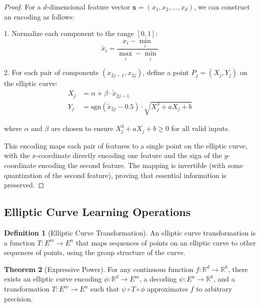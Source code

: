 \documentclass[12pt,a4paper]{article}
\theoremstyle{definition}
\newtheorem{theorem}{Theorem}
\newtheorem{definition}[theorem]{Definition}
\begin{document}
\begin{proof}
For a $d$-dimensional feature vector $\mathbf{x} = (x_1, x_2, \ldots, x_d)$, we can construct an encoding as follows:

1. Normalize each component to the range $[0, 1]$:
\begin{equation}
\tilde{x}_i = \frac{x_i - \min_i}{\max_i - \min_i}
\end{equation}

2. For each pair of components $(x_{2j-1}, x_{2j})$, define a point $P_j = (X_j, Y_j)$ on the elliptic curve:
\begin{align}
X_j &= \alpha + \beta \cdot \tilde{x}_{2j-1} \\
Y_j &= \text{sgn}(\tilde{x}_{2j} - 0.5) \cdot \sqrt{X_j^3 + aX_j + b}
\end{align}

where $\alpha$ and $\beta$ are chosen to ensure $X_j^3 + aX_j + b \geq 0$ for all valid inputs.

This encoding maps each pair of features to a single point on the elliptic curve, with the $x$-coordinate directly encoding one feature and the sign of the $y$-coordinate encoding the second feature. The mapping is invertible (with some quantization of the second feature), proving that essential information is preserved.
\end{proof}

\subsection{Elliptic Curve Learning Operations}

\begin{definition}[Elliptic Curve Transformation]
An elliptic curve transformation is a function $T: E^m \rightarrow E^n$ that maps sequences of points on an elliptic curve to other sequences of points, using the group structure of the curve.
\end{definition}

\begin{theorem}[Expressive Power]
For any continuous function $f: \mathbb{R}^d \rightarrow \mathbb{R}^k$, there exists an elliptic curve encoding $\phi: \mathbb{R}^d \rightarrow E^m$, a decoding $\psi: E^n \rightarrow \mathbb{R}^k$, and a transformation $T: E^m \rightarrow E^n$ such that $\psi \circ T \circ \phi$ approximates $f$ to arbitrary precision.
\end{theorem}
\end{document}
